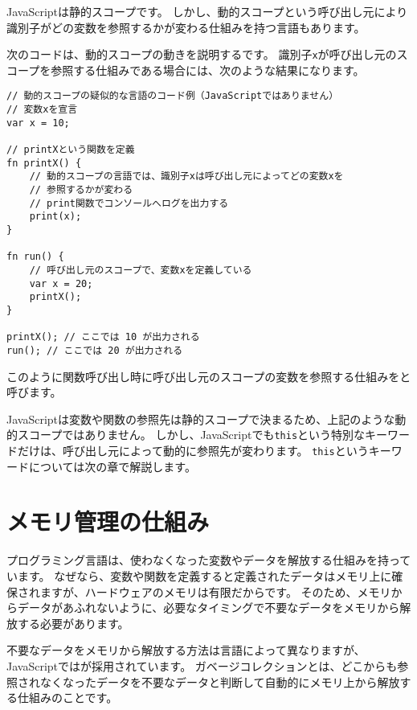 \begin{tcolorbox}[enhanced jigsaw,breakable,title=動的スコープ]\label{dynamic-scope}

JavaScriptは静的スコープです。
しかし、動的スコープという呼び出し元により識別子がどの変数を参照するかが変わる仕組みを持つ言語もあります。

次のコードは、動的スコープの動きを説明する\textbf{}です。
識別子\texttt{x}が呼び出し元のスコープを参照する仕組みである場合には、次のような結果になります。

\begin{lstlisting}
// 動的スコープの疑似的な言語のコード例（JavaScriptではありません）
// 変数xを宣言
var x = 10;

// printXという関数を定義
fn printX() {
    // 動的スコープの言語では、識別子xは呼び出し元によってどの変数xを
    // 参照するかが変わる
    // print関数でコンソールへログを出力する
    print(x);
}

fn run() {
    // 呼び出し元のスコープで、変数xを定義している
    var x = 20;
    printX();
}

printX(); // ここでは 10 が出力される
run(); // ここでは 20 が出力される
\end{lstlisting}

このように関数呼び出し時に呼び出し元のスコープの変数を参照する仕組みを\textbf{}と呼びます。

JavaScriptは変数や関数の参照先は静的スコープで決まるため、上記のような動的スコープではありません。
しかし、JavaScriptでも\texttt{this}という特別なキーワードだけは、呼び出し元によって動的に参照先が変わります。
\texttt{this}というキーワードについては次の章で解説します。
\end{tcolorbox}

\hypertarget{memory-management}{%
\section{メモリ管理の仕組み}\label{memory-management}}

プログラミング言語は、使わなくなった変数やデータを解放する仕組みを持っています。
なぜなら、変数や関数を定義すると定義されたデータはメモリ上に確保されますが、ハードウェアのメモリは有限だからです。
そのため、メモリからデータがあふれないように、必要なタイミングで不要なデータをメモリから解放する必要があります。

不要なデータをメモリから解放する方法は言語によって異なりますが、JavaScriptでは\textbf{}が採用されています。
ガベージコレクションとは、どこからも参照されなくなったデータを不要なデータと判断して自動的にメモリ上から解放する仕組みのことです。


